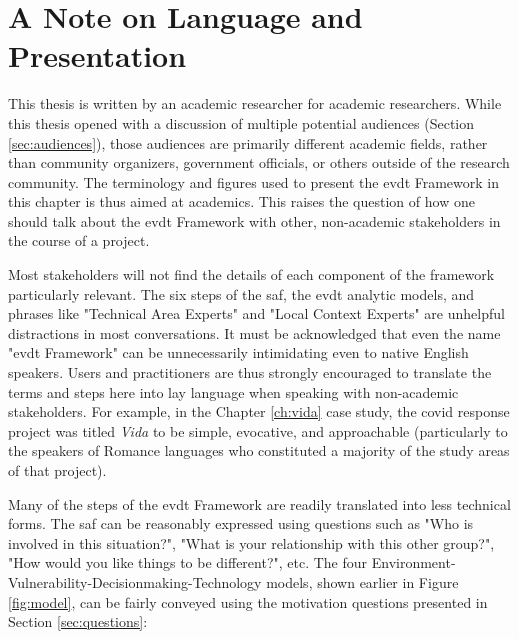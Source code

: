 
\section{A Note on Language and Presentation} \label{sec:language}

This thesis is written by an academic researcher for academic researchers. While this thesis opened with a discussion of multiple potential audiences (Section \ref{sec:audiences}), those audiences are primarily different academic fields, rather than community organizers, government officials, or others outside of the research community. The terminology and figures used to present the \ac{evdt} Framework in this chapter is thus aimed at academics. This raises the question of how one should talk about the \ac{evdt} Framework with other, non-academic stakeholders in the course of a project.

Most stakeholders will not find the details of each component of the framework particularly relevant. The six steps of the \ac{saf}, the \ac{evdt} analytic models, and phrases like "Technical Area Experts" and "Local Context Experts" are unhelpful distractions in most conversations. It must be acknowledged that even the name "\ac{evdt} Framework" can be unnecessarily intimidating even to native English speakers. Users and practitioners are thus strongly encouraged to translate the terms and steps here into lay language when speaking with non-academic stakeholders. For example, in the Chapter \ref{ch:vida} case study, the \ac{covid} response project was titled \textit{Vida} to be simple, evocative, and approachable (particularly to the speakers of Romance languages who constituted a majority of the study areas of that project).

Many of the steps of the \ac{evdt} Framework are readily translated into less technical forms. The \ac{saf} can be reasonably expressed using questions such as "Who is involved in this situation?", "What is your relationship with this other group?", "How would you like things to be different?", etc. The four Environment-Vulnerability-Decisionmaking-Technology models, shown earlier in Figure \ref{fig:model}, can be fairly conveyed using the motivation questions presented in Section \ref{sec:questions}:

